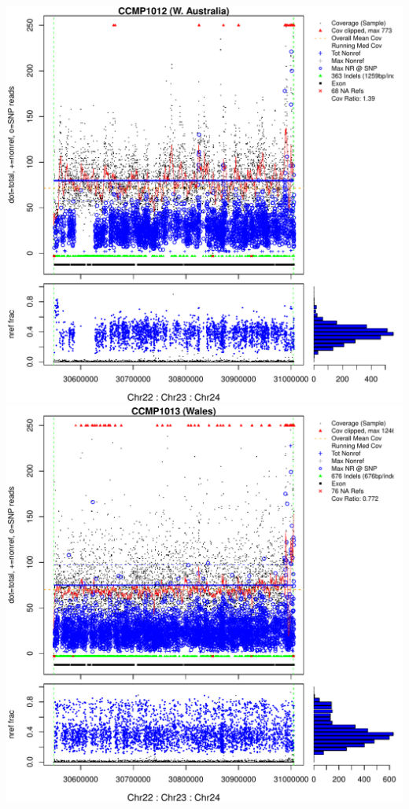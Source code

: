 \documentclass{article}\usepackage[]{graphicx}\usepackage[]{color}
\makeatletter
\def\maxwidth{ %
  \ifdim\Gin@nat@width>\linewidth
    \linewidth
  \else
    \Gin@nat@width
  \fi
}
\newenvironment{knitrout}{}{} %
\makeatother
\begin{document}
\begin{knitrout}
{\includegraphics[width=\maxwidth]{figs-knitr/unnamed-chunk-42-3} 
\includegraphics[width=\maxwidth]{figs-knitr/unnamed-chunk-42-4} 
}
\end{knitrout}
\end{document}
